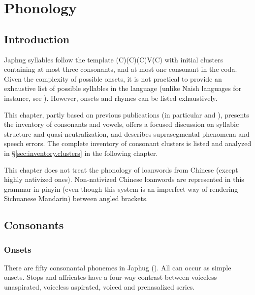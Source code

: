 \chapter{Phonology} \label{chap:phono}


\section{Introduction}
Japhug syllables follow the template (C)(C)(C)V(C) with initial clusters containing at most three consonants, and at most one consonant in the coda. Given the complexity of possible onsets, it is not practical to provide an exhaustive list of possible syllables in the language (unlike Naish languages for instance, see \citealt{boydalexis06}). However, onsets and rhymes can be listed exhaustively.

This chapter, partly based on previous publications (in particular \citealt{jacques04these} and \citealt{jacques19ipa}), presents the inventory of consonants and vowels, offers a focused discussion on syllabic structure and quasi-neutralization, and describes suprasegmental phenomena and speech errors. The complete inventory of consonant clusters is listed and analyzed in §\ref{sec:inventory.clusters} in the following chapter.

This chapter does not treat the phonology of loanwords from Chinese (except highly nativized ones). Non-nativized Chinese loanwords are represented in this grammar in pinyin (even though this system is an imperfect way of rendering Sichuanese Mandarin) between angled brackets. 


\section{Consonants}

\subsection{Onsets} \label{sec:consonant.phonemes}
There are fifty consonantal phonemes in Japhug (). All can occur as simple onsets. Stops and affricates have a four-way contrast between voiceless unaspirated, voiceless aspirated, voiced and prenasalized series.


